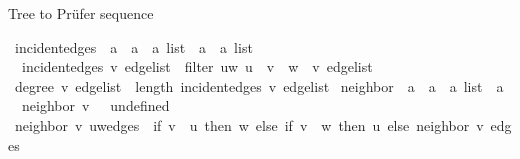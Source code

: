 \begin{isabellebody}
\begin{isamarkuptext}
Tree to Prüfer sequence%
\end{isamarkuptext}\isamarkuptrue%
\isamarkupfalse%
\ incident{\isacharunderscore}{\kern0pt}edges\ {\isacharcolon}{\kern0pt}{\isacharcolon}{\kern0pt}\ {\isachardoublequoteopen}{\isacharprime}{\kern0pt}a\ {\isasymRightarrow}\ {\isacharparenleft}{\kern0pt}{\isacharprime}{\kern0pt}a\ {\isasymtimes}\ {\isacharprime}{\kern0pt}a{\isacharparenright}{\kern0pt}\ list\ {\isasymRightarrow}\ {\isacharparenleft}{\kern0pt}{\isacharprime}{\kern0pt}a\ {\isasymtimes}\ {\isacharprime}{\kern0pt}a{\isacharparenright}{\kern0pt}\ list{\isachardoublequoteclose}\ \isanewline
\ \ {\isachardoublequoteopen}incident{\isacharunderscore}{\kern0pt}edges\ v\ edge{\isacharunderscore}{\kern0pt}list\ {\isacharequal}{\kern0pt}\ filter\ {\isacharparenleft}{\kern0pt}{\isasymlambda}{\isacharparenleft}{\kern0pt}u{\isacharcomma}{\kern0pt}w{\isacharparenright}{\kern0pt}{\isachardot}{\kern0pt}\ u\ {\isacharequal}{\kern0pt}\ v\ {\isasymor}\ w\ {\isacharequal}{\kern0pt}\ v{\isacharparenright}{\kern0pt}\ edge{\isacharunderscore}{\kern0pt}list{\isachardoublequoteclose}\isanewline
\isanewline
{}\isamarkupfalse%
\ {\isachardoublequoteopen}degree\ v\ edge{\isacharunderscore}{\kern0pt}list\ {\isasymequiv}\ length\ {\isacharparenleft}{\kern0pt}incident{\isacharunderscore}{\kern0pt}edges\ v\ edge{\isacharunderscore}{\kern0pt}list{\isacharparenright}{\kern0pt}{\isachardoublequoteclose}\isanewline
\isanewline
{}\isamarkupfalse%
\ neighbor\ {\isacharcolon}{\kern0pt}{\isacharcolon}{\kern0pt}\ {\isachardoublequoteopen}{\isacharprime}{\kern0pt}a\ {\isasymRightarrow}\ {\isacharparenleft}{\kern0pt}{\isacharprime}{\kern0pt}a\ {\isasymtimes}\ {\isacharprime}{\kern0pt}a{\isacharparenright}{\kern0pt}\ list\ {\isasymRightarrow}\ {\isacharprime}{\kern0pt}a{\isachardoublequoteclose}\ \isanewline
\ \ {\isachardoublequoteopen}neighbor\ v\ {\isacharbrackleft}{\kern0pt}{\isacharbrackright}{\kern0pt}\ {\isacharequal}{\kern0pt}\ undefined{\isachardoublequoteclose}\isanewline
{\isacharbar}{\kern0pt}\ {\isachardoublequoteopen}neighbor\ v\ {\isacharparenleft}{\kern0pt}{\isacharparenleft}{\kern0pt}u{\isacharcomma}{\kern0pt}w{\isacharparenright}{\kern0pt}{\isacharhash}{\kern0pt}edges{\isacharparenright}{\kern0pt}\ {\isacharequal}{\kern0pt}\ {\isacharparenleft}{\kern0pt}if\ v\ {\isacharequal}{\kern0pt}\ u\ then\ w\ else\ if\ v\ {\isacharequal}{\kern0pt}\ w\ then\ u\ else\ neighbor\ v\ edges{\isacharparenright}{\kern0pt}{\isachardoublequoteclose}\isanewline
\isanewline
{}\isamarkupfalse%

\end{isabellebody}
